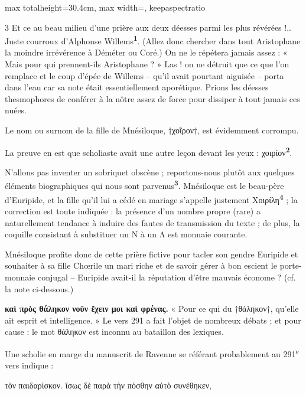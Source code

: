 \documentclass[11pt,twoside]{book}
\newcommand{\citComm}[1]{\begin{quoting}[vskip=0.4pt,leftmargin=0.7em,rightmargin=0.2em]#1\end{quoting}}
\newcommand{\nieme}[1]{#1\textsuperscript{e}}
\newcommand{\marqueur}[1]{\textsuperscript{\color{rubricRed}\textbf{#1}}}
\begin{document}
\begin{adjustbox}{max totalheight=30.4cm, max width=\textwidth, keepaspectratio}
\begin{minipage}{\textwidth}
{\begin{multicols}{3}
\noindent Et ce au beau milieu d’une prière aux deux déesses parmi les plus révérées !.. Juste courroux d'Alphonse Willems\marqueur{1}. (Allez donc chercher dans tout Aristophane la moindre irrévérence à Déméter ou Coré.) On ne le répétera jamais assez : « Mais pour qui prennent-ils Aristophane ? »  Las ! on ne détruit que ce que l'on remplace et le coup d'épée de Willems – qu'il avait pourtant aiguisée – porta dans l'eau car sa note était essentiellement aporétique. Prions les déesses thesmophores de conférer à la nôtre assez de force pour dissiper à tout jamais ces nuées.
\par\vspace{1.5pt}
\noindent Le nom ou surnom de la fille de Mnésiloque, †χοῖρον†, est évidemment corrompu.
\par\vspace{1.5pt}
\noindent La preuve en est que scholiaste avait une autre leçon devant les yeux : χοιρίον\marqueur{2}.
\par\vspace{1.5pt}
\noindent N'allons pas inventer un sobriquet obscène ; reportons-nous plutôt aux quelques éléments biographiques qui nous sont parvenus\marqueur{3}. Mnésiloque est le beau-père d'Euripide, et la fille qu'il lui a cédé en mariage s'appelle justement Χοιρίλη\marqueur{4} ; la correction est toute indiquée : la présence d'un nombre propre (rare) a naturellement tendance à induire des fautes de transmission du texte ; de plus, la coquille consistant à substituer un Ν à un Λ est monnaie courante.
\par\vspace{1.5pt}
\noindent Mnésiloque profite donc de cette prière fictive pour tacler son gendre Euripide et souhaiter à sa fille Chœrile un mari riche et de savoir gérer à bon escient le porte-monnaie conjugal -- Euripide avait-il la réputation d'être mauvais économe ? (cf. la note ci-dessous.)
\par\vspace{1.5pt}
 \textbf{καὶ πρὸς θάληκον νοῦν ἔχειν μοι καὶ φρένας.} « Pour ce qui du †θάληκον†, qu'elle ait esprit et intelligence. » Le vers 291 a fait l'objet de nombreux débats ; et pour cause : le mot θάληκον est inconnu au bataillon des lexiques.
\par\vspace{1.5pt}
\noindent Une scholie en marge du manuscrit de Ravenne se référant probablement au \nieme{291} vers indique :
\citComm{τὸν παιδαρίσκον. ἴσως δὲ παρὰ τὴν πόσθην αὐτὸ συνέθηκεν,\\
}
\end{multicols}}
\end{minipage}
\end{adjustbox}
\end{document}
